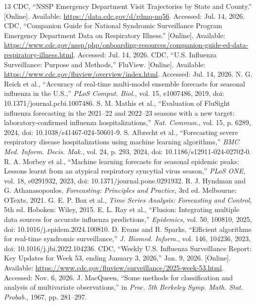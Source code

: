 \begin{thebibliography}{13}
 CDC, ``NSSP Emergency Department Visit Trajectories by State and County.'' [Online]. Available: \url{https://data.cdc.gov/d/rdmq-nq56}. Accessed: Jul. 14, 2026.
 CDC, ``Companion Guide for National Syndromic Surveillance Program Emergency Department Data on Respiratory Illness.'' [Online]. Available: \url{https://www.cdc.gov/nssp/php/onboarding-resources/companion-guide-ed-data-respiratory-illness.html}. Accessed: Jul. 14, 2026.
 CDC, ``U.S. Influenza Surveillance: Purpose and Methods,'' FluView. [Online]. Available: \url{https://www.cdc.gov/fluview/overview/index.html}. Accessed: Jul. 14, 2026.
 N. G. Reich et al., ``Accuracy of real-time multi-model ensemble forecasts for seasonal influenza in the U.S.,'' \emph{PLoS Comput. Biol.}, vol. 15, e1007486, 2019, doi: 10.1371/journal.pcbi.1007486.
 S. M. Mathis et al., ``Evaluation of FluSight influenza forecasting in the 2021--22 and 2022--23 seasons with a new target: laboratory-confirmed influenza hospitalizations,'' \emph{Nat. Commun.}, vol. 15, p. 6289, 2024, doi: 10.1038/s41467-024-50601-9.
 S. Albrecht et al., ``Forecasting severe respiratory disease hospitalizations using machine learning algorithms,'' \emph{BMC Med. Inform. Decis. Mak.}, vol. 24, p. 293, 2024, doi: 10.1186/s12911-024-02702-0.
 R. A. Morbey et al., ``Machine learning forecasts for seasonal epidemic peaks: Lessons learnt from an atypical respiratory syncytial virus season,'' \emph{PLoS ONE}, vol. 18, e0291932, 2023, doi: 10.1371/journal.pone.0291932.
 R. J. Hyndman and G. Athanasopoulos, \emph{Forecasting: Principles and Practice}, 3rd ed. Melbourne: OTexts, 2021.
 G. E. P. Box et al., \emph{Time Series Analysis: Forecasting and Control}, 5th ed. Hoboken: Wiley, 2015.
 E. L. Ray et al., ``Flusion: Integrating multiple data sources for accurate influenza predictions,'' \emph{Epidemics}, vol. 50, 100810, 2025, doi: 10.1016/j.epidem.2024.100810.
 D. Evans and R. Sparks, ``Efficient algorithms for real-time syndromic surveillance,'' \emph{J. Biomed. Inform.}, vol. 146, 104236, 2023, doi: 10.1016/j.jbi.2022.104236.
 CDC, ``Weekly U.S. Influenza Surveillance Report: Key Updates for Week 53, ending January 3, 2026,'' Jan. 9, 2026. [Online]. Available: \url{https://www.cdc.gov/fluview/surveillance/2025-week-53.html}. Accessed: Nov. 6, 2026.
 J. MacQueen, ``Some methods for classification and analysis of multivariate observations,'' in \emph{Proc. 5th Berkeley Symp. Math. Stat. Probab.}, 1967, pp. 281--297.
\end{thebibliography}
